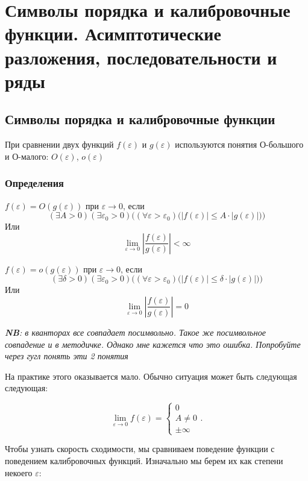 	\section{Символы порядка и калибровочные функции. Асимптотические разложения, последовательности и ряды}
	
	\subsection{Символы порядка и калибровочные функции}
	
	При сравнении двух функций $f(\varepsilon)$ и $g(\varepsilon)$ используются понятия О-большого и О-малого: $O(\varepsilon)$, $o(\varepsilon)$
	
	\subsubsection{Определения}
	
	$f(\varepsilon) = O(g(\varepsilon))$ при $\varepsilon \to 0$, если $$(\exists A > 0)(\exists \varepsilon_0 > 0)\bigl((\forall \varepsilon > \varepsilon_0)\bigl(|f(\varepsilon)| \leq A \cdot |g(\varepsilon)|\bigr)\bigr)$$ Или $$\lim_{\varepsilon \to 0} \left| \frac{f(\varepsilon)}{g(\varepsilon)} \right| < \infty$$
	
	$f(\varepsilon) = o(g(\varepsilon))$ при $\varepsilon \to 0$, если $$(\exists \delta > 0)(\exists \varepsilon_0 > 0)\bigl((\forall \varepsilon > \varepsilon_0)\bigl(|f(\varepsilon)| \leq \delta \cdot |g(\varepsilon)|\bigr)\bigr)$$ Или $$\lim_{\varepsilon \to 0} \left| \frac{f(\varepsilon)}{g(\varepsilon)} \right| = 0$$
	
	\textit{\textbf{NB}: в кванторах все совпадает посимвольно. Такое же посимвольное совпадение и в методичке. Однако мне кажется что это ошибка. Попробуйте через гугл понять эти 2 понятия}
	
	На практике этого оказывается мало. Обычно ситуация может быть следующая следующая:
	
	\begin{equation}
		\lim_{\varepsilon \to 0} f(\varepsilon) =
		\begin{cases}
			0 \\
			A \neq 0 \\
			\pm \infty
		\end{cases}.
	\end{equation}
	
	Чтобы узнать скорость сходимости, мы сравниваем поведение функции с поведением калибровочных функций. Изначально мы берем их как степени некоего $\varepsilon$:
	
